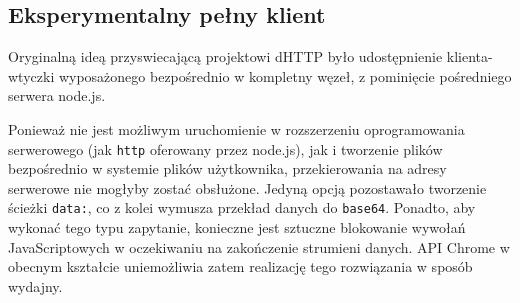 \newpage

\subsection{Eksperymentalny pełny klient}

Oryginalną ideą przyswiecającą projektowi dHTTP było udostępnienie klienta-wtyczki wyposażonego bezpośrednio w kompletny węzeł, z pominięcie pośredniego serwera node.js.

Ponieważ nie jest możliwym uruchomienie w rozszerzeniu oprogramowania serwerowego (jak \texttt{http} oferowany przez node.js), jak i tworzenie plików bezpośrednio w systemie plików użytkownika, przekierowania na adresy serwerowe nie mogłyby zostać obsłużone. Jedyną opcją pozostawało tworzenie ścieżki \texttt{data:}, co z kolei wymusza przekład danych do \texttt{base64}. Ponadto, aby wykonać tego typu zapytanie, konieczne jest sztuczne blokowanie wywołań JavaScriptowych w oczekiwaniu na zakończenie strumieni danych. API Chrome w obecnym kształcie uniemożliwia zatem realizację tego rozwiązania w sposób wydajny.
